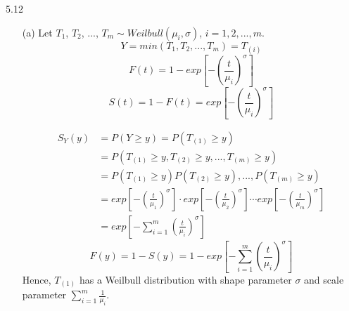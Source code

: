 \documentclass[paper=a4, fontsize=12pt]{scrartcl} %
\numberwithin{equation}{section} %
\numberwithin{figure}{section} %
\numberwithin{table}{section} %
\begin{document}
5.12
\begin{itemize}
	\item[(a)]	Let $T_1$, $T_2$, ..., $T_m \sim Weilbull(\mu_i, \sigma)$, $i = 1, 2, ..., m$. 
			$$Y=min(T_1, T_2, ..., T_m)=T_{(i)}$$
			$$F(t) = 1-exp\left[-\left( \frac{t}{\mu_i}\right)^\sigma \right]$$
			$$S(t) = 1-F(t) = exp\left[-\left( \frac{t}{\mu_i}\right)^\sigma \right]$$
			
			\begin{align*}
				S_Y(y)	&=	P(Y \geq y) = P(T_{(1)} \geq y) \\
						&=	P(T_{(1)} \geq y, T_{(2)} \geq y, ..., T_{(m)} \geq y) \\
						&=	P(T_{(1)} \geq y)P(T_{(2)} \geq y), ..., P(T_{(m)} \geq y) \\
						&=	exp\left[-\left( \frac{t}{\mu_1}\right)^\sigma \right] \cdot
							exp\left[-\left( \frac{t}{\mu_2}\right)^\sigma \right] \cdots
							exp\left[-\left( \frac{t}{\mu_m}\right)^\sigma \right] \\
						&=	exp\left[-\sum_{i=1}^m\left( \frac{t}{\mu_i}\right)^\sigma \right]
			\end{align*}
			$$ F(y) = 1- S(y) = 1-exp\left[-\sum_{i=1}^m\left( \frac{t}{\mu_i}\right)^\sigma \right]$$
			Hence, $T_{(1)}$ has a Weilbull distribution with shape parameter $\sigma$ and scale parameter $\sum_{i = 1}^m\frac{1}{\mu_i}$.
\end{itemize}
\end{document}
